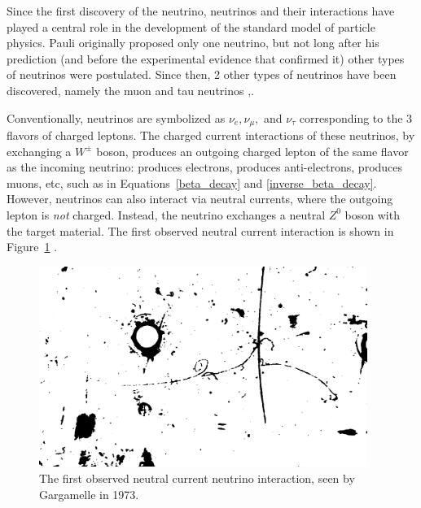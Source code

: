 Since the first discovery of the neutrino, neutrinos and their interactions have played a central role in the development of the standard model of particle physics.  Pauli originally proposed only one neutrino, but not long after his prediction (and before the experimental evidence that confirmed it) other types of neutrinos were postulated.   Since then, 2 other types of neutrinos have been discovered, namely the muon and tau neutrinos \cite{PhysRevLett.9.36},\cite{Kodama:2000mp}. 

Conventionally, neutrinos are symbolized as $\nu_e, \nu_\mu,$ and $\nu_\tau$ corresponding to the 3 flavors of charged leptons.  The charged current interactions of these neutrinos, by exchanging a $W^\pm$ boson, produces an outgoing charged lepton of the same flavor as the incoming neutrino: \nue produces electrons, \nuebar produces anti-electrons, \numu produces muons, etc, such as in Equations~\ref{beta_decay} and \ref{inverse_beta_decay}.  However, neutrinos can also interact via neutral currents, where the outgoing lepton is {\em not} charged.  Instead, the neutrino exchanges a neutral $Z^0$ boson with the target material.  The first observed neutral current interaction is shown in Figure~\ref{fig:gargamelle_nc} \cite{Hasert:1973ff}.

\begin{figure}[htbp]
  \centering
  \includegraphics[width=0.95\textwidth]{intro_figures/gargamelle_nc.png}
  \caption[First Observed Neutral Current Neutrino Interaction]{The first observed neutral current neutrino interaction, seen by Gargamelle in 1973.}
  \label{fig:gargamelle_nc}
\end{figure}


